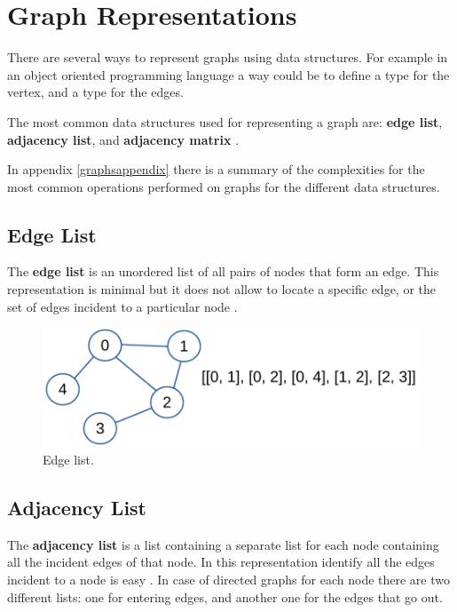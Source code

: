 \section{Graph Representations}
There are several ways to represent graphs using data structures. For example in an object oriented programming language a way could be to define a type for the vertex, and a type for the edges.

The most common data structures used for representing a graph are: \textbf{edge list}, \textbf{adjacency list}, and \textbf{adjacency matrix} \cite{goodrich2013data}. 

In appendix \ref{graphsappendix} there is a summary of the complexities for the most common operations performed on graphs for the different data structures.

\subsection{Edge List}
The \textbf{edge list} is an unordered list of all pairs of nodes that form an edge. This representation is minimal but it does not allow to locate a specific edge, or the set of edges incident to a particular node \cite{goodrich2013data}.

\begin{figure}[H]
	\begin{center}
		\includegraphics[scale=.6]{chapters/graphs/images/graphs_3.pdf}
		\caption[Edge list.]{Edge list.}
		\label{graphs_3}
	\end{center}
\end{figure}

\subsection{Adjacency List}
The \textbf{adjacency list} is a list containing a separate list for each node containing all the incident edges of that node. In this representation identify all the edges incident to a node is easy \cite{goodrich2013data}. In case of directed graphs for each node there are two different lists: one for entering edges, and another one for the edges that go out.

